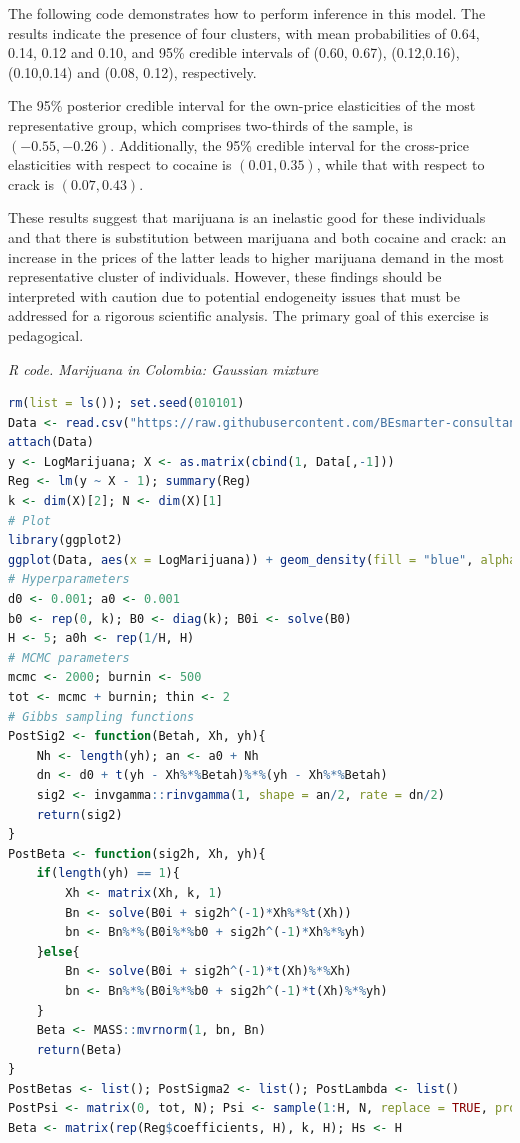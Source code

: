 \begin{enumerate}[leftmargin=*]
The following code demonstrates how to perform inference in this model. The results indicate the presence of four clusters, with mean probabilities of 0.64, 0.14, 0.12 and 0.10, and 95\% credible intervals of (0.60, 0.67), (0.12,0.16), (0.10,0.14) and (0.08, 0.12), respectively.  

The 95\% posterior credible interval for the own-price elasticities of the most representative group, which comprises two-thirds of the sample, is $(-0.55, -0.26)$. Additionally, the 95\% credible interval for the cross-price elasticities with respect to cocaine is $(0.01, 0.35)$, while that with respect to crack is $(0.07, 0.43)$.

These results suggest that marijuana is an inelastic good for these individuals and that there is substitution between marijuana and both cocaine and crack: an increase in the prices of the latter leads to higher marijuana demand in the most representative cluster of individuals. However, these findings should be interpreted with caution due to potential endogeneity issues that must be addressed for a rigorous scientific analysis. The primary goal of this exercise is pedagogical. 
 

\begin{tcolorbox}[enhanced,width=4.67in,center upper,
	fontupper=\large\bfseries,drop shadow southwest,sharp corners]
	\textit{R code. Marijuana in Colombia: Gaussian mixture}
	\begin{VF}
		\begin{lstlisting}[language=R]
rm(list = ls()); set.seed(010101)
Data <- read.csv("https://raw.githubusercontent.com/BEsmarter-consultancy/BSTApp/refs/heads/master/DataApp/MarijuanaColombia.csv")
attach(Data)
y <- LogMarijuana; X <- as.matrix(cbind(1, Data[,-1]))
Reg <- lm(y ~ X - 1); summary(Reg)
k <- dim(X)[2]; N <- dim(X)[1]
# Plot
library(ggplot2)
ggplot(Data, aes(x = LogMarijuana)) + geom_density(fill = "blue", alpha = 0.3) + labs(title = "Density Plot", x = "y", y = "Density") + theme_minimal()
# Hyperparameters
d0 <- 0.001; a0 <- 0.001
b0 <- rep(0, k); B0 <- diag(k); B0i <- solve(B0)
H <- 5; a0h <- rep(1/H, H)
# MCMC parameters
mcmc <- 2000; burnin <- 500
tot <- mcmc + burnin; thin <- 2
# Gibbs sampling functions
PostSig2 <- function(Betah, Xh, yh){
	Nh <- length(yh); an <- a0 + Nh
	dn <- d0 + t(yh - Xh%*%Betah)%*%(yh - Xh%*%Betah)
	sig2 <- invgamma::rinvgamma(1, shape = an/2, rate = dn/2)
	return(sig2)
}
PostBeta <- function(sig2h, Xh, yh){
	if(length(yh) == 1){
		Xh <- matrix(Xh, k, 1)
		Bn <- solve(B0i + sig2h^(-1)*Xh%*%t(Xh))
		bn <- Bn%*%(B0i%*%b0 + sig2h^(-1)*Xh%*%yh)
	}else{
		Bn <- solve(B0i + sig2h^(-1)*t(Xh)%*%Xh)
		bn <- Bn%*%(B0i%*%b0 + sig2h^(-1)*t(Xh)%*%yh)
	}
	Beta <- MASS::mvrnorm(1, bn, Bn)
	return(Beta)
}
PostBetas <- list(); PostSigma2 <- list(); PostLambda <- list()
PostPsi <- matrix(0, tot, N); Psi <- sample(1:H, N, replace = TRUE, prob = a0h)
Beta <- matrix(rep(Reg$coefficients, H), k, H); Hs <- H
\end{lstlisting}
	\end{VF}
\end{tcolorbox}


\end{enumerate}
